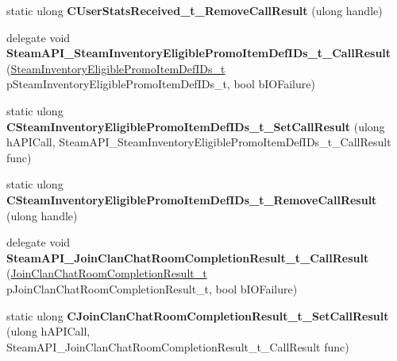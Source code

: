 \begin{DoxyCompactItemize}
\mbox{\label{class_valve_1_1_interop_1_1_native_entrypoints_ab01f238120d2bd83eb63393fc28da85d}} 
static ulong {\bfseries C\+User\+Stats\+Received\+\_\+t\+\_\+\+Remove\+Call\+Result} (ulong handle)
\item 
\mbox{\label{class_valve_1_1_interop_1_1_native_entrypoints_a39d58da26df3ab97f31efb1096b7d2b8}} 
delegate void {\bfseries Steam\+A\+P\+I\+\_\+\+Steam\+Inventory\+Eligible\+Promo\+Item\+Def\+I\+Ds\+\_\+t\+\_\+\+Call\+Result} (\hyperlink{struct_valve_1_1_steamworks_1_1_steam_inventory_eligible_promo_item_def_i_ds__t}{Steam\+Inventory\+Eligible\+Promo\+Item\+Def\+I\+Ds\+\_\+t} p\+Steam\+Inventory\+Eligible\+Promo\+Item\+Def\+I\+Ds\+\_\+t, bool b\+I\+O\+Failure)
\item 
\mbox{\label{class_valve_1_1_interop_1_1_native_entrypoints_a03578ad30c75eda9e2214ff115091727}} 
static ulong {\bfseries C\+Steam\+Inventory\+Eligible\+Promo\+Item\+Def\+I\+Ds\+\_\+t\+\_\+\+Set\+Call\+Result} (ulong h\+A\+P\+I\+Call, Steam\+A\+P\+I\+\_\+\+Steam\+Inventory\+Eligible\+Promo\+Item\+Def\+I\+Ds\+\_\+t\+\_\+\+Call\+Result func)
\item 
\mbox{\label{class_valve_1_1_interop_1_1_native_entrypoints_a23d944c6cccd6639925402dd85d2a5d5}} 
static ulong {\bfseries C\+Steam\+Inventory\+Eligible\+Promo\+Item\+Def\+I\+Ds\+\_\+t\+\_\+\+Remove\+Call\+Result} (ulong handle)
\item 
\mbox{\label{class_valve_1_1_interop_1_1_native_entrypoints_ae4d2a1da20a5fac244d98b7b33858b33}} 
delegate void {\bfseries Steam\+A\+P\+I\+\_\+\+Join\+Clan\+Chat\+Room\+Completion\+Result\+\_\+t\+\_\+\+Call\+Result} (\hyperlink{struct_valve_1_1_steamworks_1_1_join_clan_chat_room_completion_result__t}{Join\+Clan\+Chat\+Room\+Completion\+Result\+\_\+t} p\+Join\+Clan\+Chat\+Room\+Completion\+Result\+\_\+t, bool b\+I\+O\+Failure)
\item 
\mbox{\label{class_valve_1_1_interop_1_1_native_entrypoints_a800439f098cce8f77c554aca4ac3d31f}} 
static ulong {\bfseries C\+Join\+Clan\+Chat\+Room\+Completion\+Result\+\_\+t\+\_\+\+Set\+Call\+Result} (ulong h\+A\+P\+I\+Call, Steam\+A\+P\+I\+\_\+\+Join\+Clan\+Chat\+Room\+Completion\+Result\+\_\+t\+\_\+\+Call\+Result func)

\end{DoxyCompactItemize}
